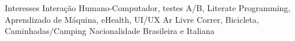 \begin{cvinterests}
  \cvskill
    {Interesses}
    {Interação Humano-Computador, testes A/B, Literate Programming, Aprendizado de Máquina, eHealth, UI/UX}
  \cvskill
    {Ar Livre}
    {Correr, Bicicleta, Caminhadas/Camping}
  \cvskill
    {Nacionalidade}
    {Brasileira e Italiana}
\end{cvinterests}
